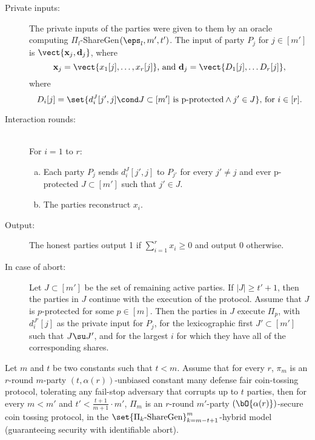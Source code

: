 \begin{protocol}[$\Pi_{l}$]\label{protocol:reduction}\hfill
\begin{description}
	\item[Private inputs:] The private inputs of the parties were given to them by an oracle computing $\Pi_{l}$-ShareGen$(\eps_{l},m',t')$.
The input of party $P_j$ for $j\in[m']$ is $\vect{\textbf{x}_j,\textbf{d}_j}$, where 
$$\textbf{x}_j=\vect{x_1[j],\ldots,x_r[j]}\text{, and }\textbf{d}_j=\vect{D_1[j],\ldots D_r[j]},$$
where 
$$D_i[j]=\set{d^J_i[j',j]\cond J\subset[m']\text{ is p-protected} \wedge j'\in J}\text{, for }i\in[r].$$
	\item[Interaction rounds:]~\\
		For $i=1$ to $r$:
		\begin{enumerate}[(a)]
			\item Each party $P_j$ sends $d^J_i[j',j]$ to $P_{j'}$ for every $j'\ne j$ and ever p-protected $J\subset[m']$ such that $j'\in J$.
			\item The parties reconstruct $x_i$.
		\end{enumerate}
	\item[Output:] The honest parties output 1 if $\sum_{i=1}^r {x_i}\geq0$ and output 0 otherwise.
	\item[In case of abort:]
		Let $J\subset[m']$ be the set of remaining active parties. If $|J|\geq t'+1$, then the parties in $J$ continue with the execution of the protocol. Assume that $J$ is $p$-protected for some $p\in[m]$. Then the parties in $J$ execute $\Pi_{p}$, with $d^{J'}_i[j]$ as the private input for $P_j$, for the lexicographic first $J'\subset[m']$ such that $J\su J'$, and for the largest $i$ for which they have all of the corresponding shares.
\end{description}
\end{protocol}

\begin{theorem}\label{thm:MainResultReduction}
	Let $m$ and $t$ be two constants such that $t<m$. Assume that for every $r$, $\pi_m$ is an $r$-round $m$-party $(t,\alpha(r))$-unbiased constant many defense fair coin-tossing protocol, tolerating any fail-stop adversary that corrupts up to $t$ parties, then for every $m<m'$ and $t'<\frac{t+1}{m+1}\cdot m'$, $\Pi_m$ is an $r$-round $m'$-party $(\bO{\alpha(r)})$-secure coin tossing protocol, in the $\set{\Pi_k\text{-ShareGen}}_{k=m-t+1}^{m}$-hybrid model (guaranteeing security with identifiable abort).
\end{theorem}

